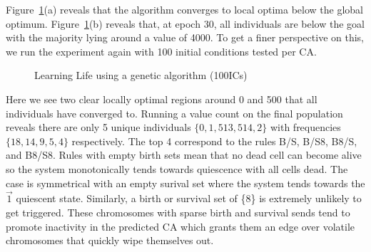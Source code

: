 Figure~\ref{fig:life-nothing}(a) reveals that the algorithm converges to local optima below the global optimum. Figure~\ref{fig:life-nothing}(b) reveals that, at epoch 30, all individuals are below the goal with the majority lying around a value of 4000. To get a finer perspective on this, we run the experiment again with 100 initial conditions tested per CA.

\begin{figure}[!h]
\centering
            \hfill
            \hfill
            \caption{Learning Life using a genetic algorithm (100ICs)}
\label{fig:life-nothing}
\end{figure}

Here we see two clear locally optimal regions around 0 and 500 that all individuals have converged to. Running a value count on the final population reveals there are only 5 unique individuals $\{ 0, 1, 513, 514, 2 \}$ with frequencies $\{18, 14, 9, 5, 4 \}$ respectively. The top 4 correspond to the rules B/S, B/S8, B8/S, and B8/S8. Rules with empty birth sets mean that no dead cell can become alive so the system monotonically tends towards quiescence with all cells dead. The case is symmetrical with an empty surival set where the system tends towards the $\vec{1}$ quiescent state. Similarly, a birth or survival set of \{8\} is extremely unlikely to get triggered. These chromosomes with sparse birth and survival sends tend to promote inactivity in the predicted CA which grants them an edge over volatile chromosomes that quickly wipe themselves out.


